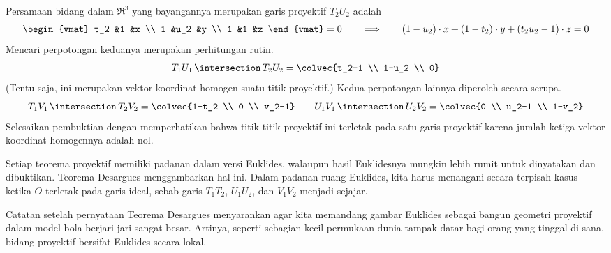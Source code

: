 Persamaan bidang dalam $\Re^3$ yang bayangannya merupakan garis proyektif
$T_2U_2$ adalah
\begin{equation*}
  \begin{vmat}
    t_2  &1    &x  \\
    1    &u_2  &y  \\
    1    &1    &z
  \end{vmat}=0
  \qquad
  \Longrightarrow
  \qquad
  (1-u_2)\cdot x+(1-t_2)\cdot y+(t_2u_2-1)\cdot z=0
\end{equation*}
Mencari perpotongan keduanya merupakan perhitungan rutin.
\begin{equation*}
  T_1U_1\,\intersection\, T_2U_2
  =\colvec{t_2-1 \\ 1-u_2 \\ 0}
\end{equation*}
(Tentu saja, ini merupakan vektor koordinat homogen suatu titik proyektif.)
Kedua perpotongan lainnya diperoleh secara serupa.
\begin{equation*}
  T_1V_1\,\intersection\, T_2V_2
  =\colvec{1-t_2 \\ 0 \\ v_2-1}
  \qquad
  U_1V_1\,\intersection\, U_2V_2
  =\colvec{0 \\ u_2-1 \\ 1-v_2}
\end{equation*}
Selesaikan pembuktian dengan memperhatikan bahwa titik-titik proyektif ini
terletak pada satu garis proyektif karena jumlah ketiga vektor koordinat
homogennya adalah nol.

Setiap teorema proyektif memiliki padanan dalam versi Euklides, walaupun hasil
Euklidesnya mungkin lebih rumit untuk dinyatakan dan dibuktikan.
Teorema Desargues menggambarkan hal ini.
Dalam padanan ruang Euklides, kita harus menangani secara terpisah kasus ketika
$O$ terletak pada garis ideal, sebab garis $T_1T_2$, $U_1U_2$, dan $V_1V_2$
menjadi sejajar.

Catatan setelah pernyataan Teorema Desargues menyarankan agar kita memandang
gambar Euklides sebagai bangun geometri proyektif dalam model bola berjari-jari
sangat besar.
Artinya, seperti sebagian kecil permukaan dunia tampak datar bagi orang yang
tinggal di sana, bidang proyektif bersifat Euklides secara lokal.

